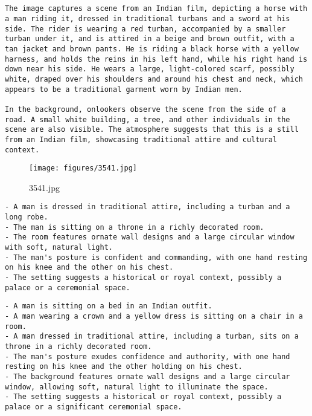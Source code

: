 \begin{lstlisting}[caption={Captions using Llama 3.2 with SAM 2 for 2296.jpg}]


The image captures a scene from an Indian film, depicting a horse with a man riding it, dressed in traditional turbans and a sword at his side. The rider is wearing a red turban, accompanied by a smaller turban under it, and is attired in a beige and brown outfit, with a tan jacket and brown pants. He is riding a black horse with a yellow harness, and holds the reins in his left hand, while his right hand is down near his side. He wears a large, light-colored scarf, possibly white, draped over his shoulders and around his chest and neck, which appears to be a traditional garment worn by Indian men.

In the background, onlookers observe the scene from the side of a road. A small white building, a tree, and other individuals in the scene are also visible. The atmosphere suggests that this is a still from an Indian film, showcasing traditional attire and cultural context.
\end{lstlisting}

\clearpage
\begin{figure}[H]
    \centering
    \texttt{[image: figures/3541.jpg]}
    \caption{3541.jpg}
    \label{fig:3541.jpg}
\end{figure}



\begin{lstlisting}[caption={Captions using Ensemble without Llama for 3541.jpg}]
- A man is dressed in traditional attire, including a turban and a long robe.
- The man is sitting on a throne in a richly decorated room.
- The room features ornate wall designs and a large circular window with soft, natural light.
- The man's posture is confident and commanding, with one hand resting on his knee and the other on his chest.
- The setting suggests a historical or royal context, possibly a palace or a ceremonial space.
\end{lstlisting}


\begin{lstlisting}[caption={Captions using Ensemble with Llama for 3541.jpg}]
- A man is sitting on a bed in an Indian outfit.
- A man wearing a crown and a yellow dress is sitting on a chair in a room.
- A man dressed in traditional attire, including a turban, sits on a throne in a richly decorated room.
- The man's posture exudes confidence and authority, with one hand resting on his knee and the other holding on his chest.
- The background features ornate wall designs and a large circular window, allowing soft, natural light to illuminate the space.
- The setting suggests a historical or royal context, possibly a palace or a significant ceremonial space.
\end{lstlisting}


